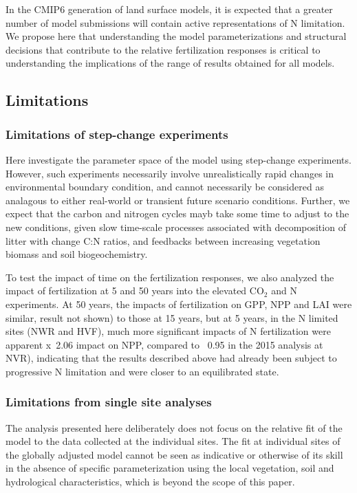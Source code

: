 \documentclass[draft,linenumbers]{agujournal}
\begin{document}
In the CMIP6 generation of land surface models, it is expected that a greater number of model submissions will contain active representations of N limitation. We propose here that understanding the model parameterizations and structural decisions that contribute to the relative fertilization responses is critical to understanding the implications of the range of results obtained for all models. 

\subsection{Limitations}
\subsubsection{Limitations of step-change experiments}
Here investigate the parameter space of the model using step-change experiments. However, such experiments necessarily involve unrealistically rapid changes in environmental boundary condition, and cannot necessarily be considered as analagous to either real-world or transient future scenario conditions. Further, we expect that the carbon and nitrogen cycles mayb take some time to adjust to the new conditions, given slow time-scale processes associated with decomposition of litter with change C:N ratios, and feedbacks between increasing vegetation biomass and soil biogeochemistry.

To test the impact of time on the fertilization responses, we also analyzed the impact of fertilization at 5 and 50 years into the elevated CO$_{2}$ and N experiments. At 50 years, the impacts of fertilization on GPP, NPP and LAI were similar, result not shown) to those at 15 years, but at 5 years, in the N limited sites (NWR and HVF), much more significant impacts of N fertilization were apparent x~2.06 impact on NPP, compared to ~0.95 in the 2015 analysis at NVR), indicating that the results described above had already been subject to progressive N limitation and were closer to an equilibrated state.

\subsubsection{Limitations from single site analyses}
The analysis presented here deliberately does not focus on the relative fit of the model to the data collected at the individual sites. The fit at individual sites of the globally adjusted model cannot be seen as indicative or otherwise of its skill in the absence of specific parameterization using the local vegetation, soil and hydrological characteristics, which is beyond the scope of this paper.
\end{document}
